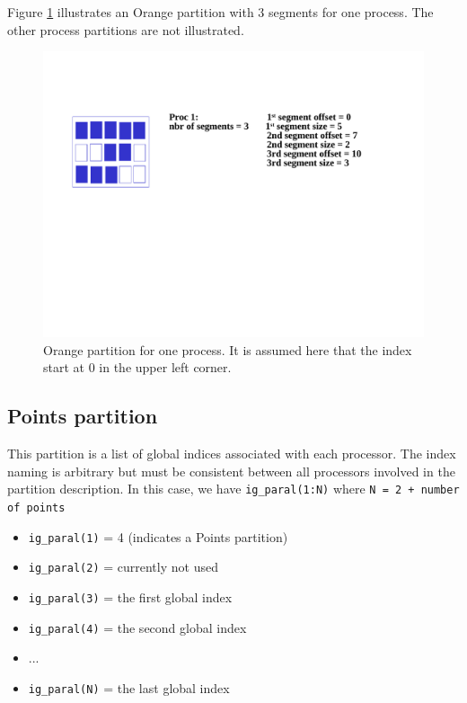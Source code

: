Figure \ref{orange_partition} illustrates an Orange partition with 3
segments for one process. The other process partitions are not
illustrated.

\begin{figure}
  \includegraphics[scale=.6]{figures/orange_new}
  \caption{Orange partition for one process. It is assumed here that
    the index start at 0 in the upper left corner.}
  \label{orange_partition}
\end{figure}

\subsection{Points partition}

This partition is a list of global indices associated with each
processor.  The index naming
is arbitrary but must be consistent between all processors involved
in the partition description.  In
this case, we have {\tt ig\_paral(1:N)} where {\tt N = 2 + number of
  points}

\begin{itemize}
\item {\tt ig\_paral(1)} = 4 (indicates a Points partition)
\item {\tt ig\_paral(2)} = currently not used
\item {\tt ig\_paral(3)} = the first global index
\item {\tt ig\_paral(4)} = the second global index
\item ...
\item {\tt ig\_paral(N)} = the last global index
\end{itemize}

